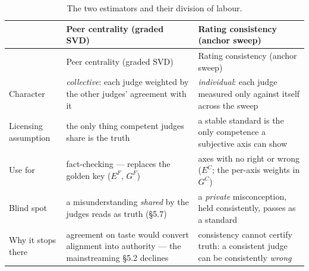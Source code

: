 \begin{longtable}[]{@{}
  >{\raggedright\arraybackslash}p{}
  >{\raggedright\arraybackslash}p{}
  >{\raggedright\arraybackslash}p{}@{}}
\caption{The two estimators and their division of labour.}\tabularnewline
\toprule\noalign{}
\begin{minipage}[b]{\linewidth}\raggedright
\end{minipage} & \begin{minipage}[b]{\linewidth}\raggedright
Peer centrality (graded SVD)
\end{minipage} & \begin{minipage}[b]{\linewidth}\raggedright
Rating consistency (anchor sweep)
\end{minipage} \\
\midrule\noalign{}
\endfirsthead
\toprule\noalign{}
\begin{minipage}[b]{\linewidth}\raggedright
\end{minipage} & \begin{minipage}[b]{\linewidth}\raggedright
Peer centrality (graded SVD)
\end{minipage} & \begin{minipage}[b]{\linewidth}\raggedright
Rating consistency (anchor sweep)
\end{minipage} \\
\midrule\noalign{}
\endhead
\bottomrule\noalign{}
\endlastfoot
Character & \emph{collective}: each judge weighted by the other judges' agreement with it & \emph{individual}: each judge measured only against itself across the sweep \\
Licensing assumption & the only thing competent judges share is the truth & a stable standard is the only competence a subjective axis can show \\
Use for & fact-checking --- replaces the golden key (\(E^{F}\), \(G^{F}\)) & axes with no right or wrong (\(E^{C}\); the per-axis weights in \(G^{C}\)) \\
Blind spot & a misunderstanding \emph{shared} by the judges reads as truth (§5.7) & a \emph{private} misconception, held consistently, passes as a standard \\
Why it stops there & agreement on taste would convert alignment into authority --- the mainstreaming §5.2 declines & consistency cannot certify truth: a consistent judge can be consistently \emph{wrong} \\
\end{longtable}

